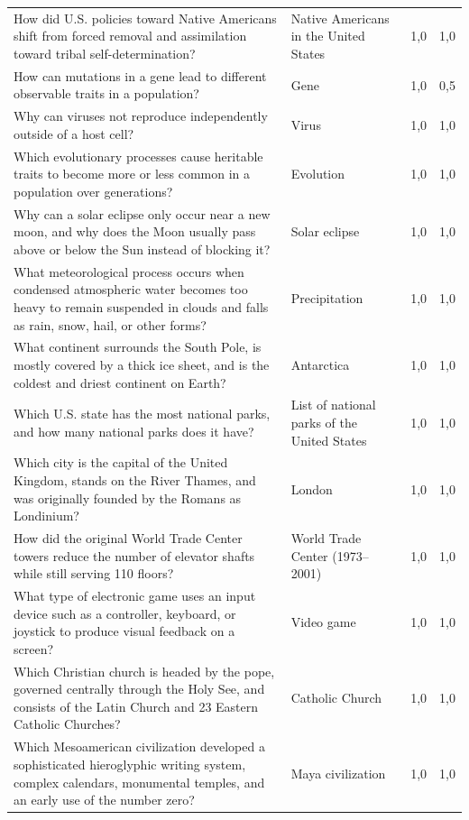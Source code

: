 \begin{longtable}{@{}>{\raggedright\arraybackslash}p{6.4cm}>{\raggedright\arraybackslash}p{3.6cm}p{1.5cm}p{1cm}@{}}
How did U.S. policies toward Native Americans shift from forced removal and assimilation toward tribal self-determination?
& Native Americans in the United States & 1,0 & 1,0 \\

How can mutations in a gene lead to different observable traits in a population?
& Gene & 1,0 & 0,5 \\

Why can viruses not reproduce independently outside of a host cell?
& Virus & 1,0 & 1,0 \\

Which evolutionary processes cause heritable traits to become more or less common in a population over generations?
& Evolution & 1,0 & 1,0 \\

Why can a solar eclipse only occur near a new moon, and why does the Moon usually pass above or below the Sun instead of blocking it?
& Solar eclipse & 1,0 & 1,0 \\

What meteorological process occurs when condensed atmospheric water becomes too heavy to remain suspended in clouds and falls as rain, snow, hail, or other forms?
& Precipitation & 1,0 & 1,0 \\

What continent surrounds the South Pole, is mostly covered by a thick ice sheet, and is the coldest and driest continent on Earth?
& Antarctica & 1,0 & 1,0 \\

Which U.S. state has the most national parks, and how many national parks does it have?
& List of national parks of the United States & 1,0 & 1,0 \\

Which city is the capital of the United Kingdom, stands on the River Thames, and was originally founded by the Romans as Londinium?
& London & 1,0 & 1,0 \\

How did the original World Trade Center towers reduce the number of elevator shafts while still serving 110 floors?
& World Trade Center (1973--2001) & 1,0 & 1,0 \\

What type of electronic game uses an input device such as a controller, keyboard, or joystick to produce visual feedback on a screen?
& Video game & 1,0 & 1,0 \\

Which Christian church is headed by the pope, governed centrally through the Holy See, and consists of the Latin Church and 23 Eastern Catholic Churches?
& Catholic Church & 1,0 & 1,0 \\

Which Mesoamerican civilization developed a sophisticated hieroglyphic writing system, complex calendars, monumental temples, and an early use of the number zero?
& Maya civilization & 1,0 & 1,0 \\
\end{longtable}

